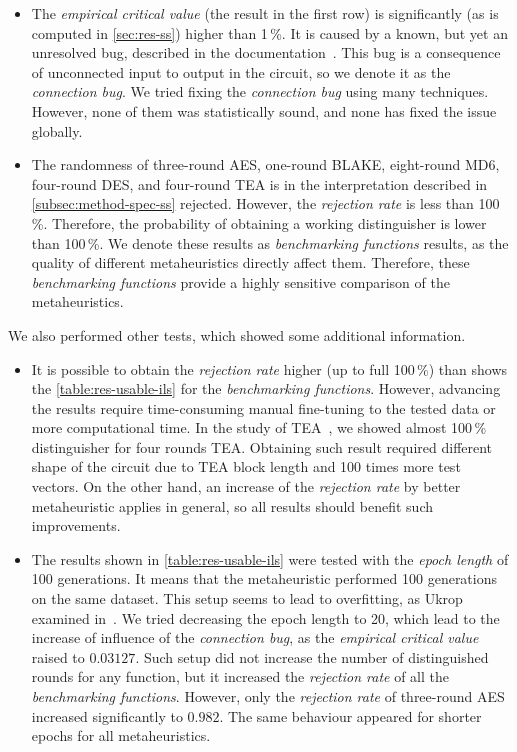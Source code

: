 \documentclass[
  print, %
  Table,   %
  nolof,     %
  nolot,     %
  11pt, %
  oneside  %
]{fithesis3}
\begin{document}
\begin{itemize}
    \item The \textit{empirical critical value} (the result in the first row) is significantly (as is computed in \cref{sec:res-ss}) higher than 1\,\%. It is caused by a known, but yet an unresolved bug, described in the documentation~\cite{EACirc-wiki-bug}. This bug is a consequence of unconnected input to output in the circuit, so we denote it as the \textit{connection bug}. We tried fixing the \textit{connection bug} using many techniques. However, none of them was statistically sound, and none has fixed the issue globally.
    \item The randomness of three-round AES, one-round BLAKE, eight-round MD6, four-round DES, and four-round TEA is in the interpretation described in \cref{subsec:method-spec-ss} rejected. However, the \textit{rejection rate} is less than 100\,\%. Therefore, the probability of obtaining a working distinguisher is lower than 100\,\%. We denote these results as \textit{benchmarking functions} results, as the quality of different metaheuristics directly affect them. Therefore, these \textit{benchmarking functions} provide a highly sensitive comparison of the metaheuristics.
\end{itemize}

We also performed other tests, which showed some additional information.

\begin{itemize}
    \item It is possible to obtain the \textit{rejection rate} higher (up to full 100\,\%) than shows the \cref{table:res-usable-ils} for the \textit{benchmarking functions}. However, advancing the results require time-consuming manual fine-tuning to the tested data or more computational time. In the study of TEA~\cite{kubicek2016new}, we showed almost 100\,\% distinguisher for four rounds TEA. Obtaining such result required different shape of the circuit due to TEA block length and 100 times more test vectors. On the other hand, an increase of the \textit{rejection rate} by better metaheuristic applies in general, so all results should benefit such improvements.
    
    \item The results shown in \cref{table:res-usable-ils} were tested with the \textit{epoch length} of 100 generations. It means that the metaheuristic performed 100 generations on the same dataset. This setup seems to lead to overfitting, as Ukrop examined in~\cite[Section~7.1]{ukropBcThesis}. We tried decreasing the epoch length to 20, which lead to the increase of influence of the \textit{connection bug}, as the \textit{empirical critical value} raised to $0.03127$. Such setup did not increase the number of distinguished rounds for any function, but it increased the \textit{rejection rate} of all the \textit{benchmarking functions}. However, only the \textit{rejection rate} of three-round AES increased significantly to $0.982$. The same behaviour appeared for shorter epochs for all metaheuristics.
\end{itemize}
\end{document}
